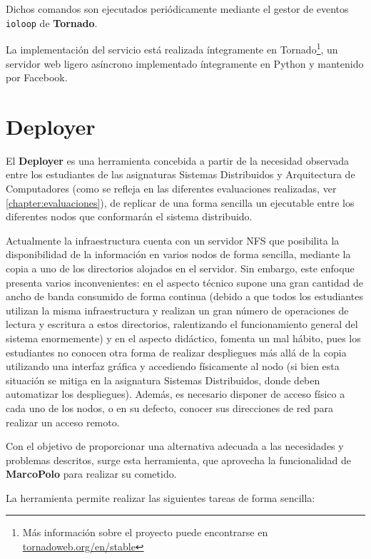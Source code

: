 Dichos comandos son ejecutados periódicamente mediante el gestor de eventos \texttt{ioloop} de \textbf{Tornado}.

La implementación del servicio está realizada íntegramente en Tornado\footnote{Más información sobre el proyecto puede encontrarse en \href{http://www.tornadoweb.org/en/stable/}{tornadoweb.org/en/stable}}, un servidor web ligero asíncrono implementado íntegramente en Python y mantenido por Facebook.

\section{Deployer}

El \textbf{Deployer} es una herramienta concebida a partir de la necesidad observada entre los estudiantes de las asignaturas Sistemas Distribuidos y Arquitectura de Computadores (como se refleja en las diferentes evaluaciones realizadas, ver \ref{chapter:evaluaciones}), de replicar de una forma sencilla un ejecutable entre los diferentes nodos que conformarán el sistema distribuido.

Actualmente la infraestructura cuenta con un servidor NFS que posibilita la disponibilidad de la información en varios nodos de forma sencilla, mediante la copia a uno de los directorios alojados en el servidor. Sin embargo, este enfoque presenta varios inconvenientes: en el aspecto técnico supone una gran cantidad de ancho de banda consumido de forma continua (debido a que todos los estudiantes utilizan la misma infraestructura y realizan un gran número de operaciones de lectura y escritura a estos directorios, ralentizando el funcionamiento general del sistema enormemente) y en el aspecto didáctico, fomenta un mal hábito, pues los estudiantes no conocen otra forma de realizar despliegues más allá de la copia utilizando una interfaz gráfica y accediendo físicamente al nodo (si bien esta situación se mitiga en la asignatura Sistemas Distribuidos, donde deben automatizar los despliegues). Además, es necesario disponer de acceso físico a cada uno de los nodos, o en su defecto, conocer sus direcciones de red para realizar un acceso remoto.

Con el objetivo de proporcionar una alternativa adecuada a las necesidades y problemas descritos, surge esta herramienta, que aprovecha la funcionalidad de \textbf{MarcoPolo} para realizar su cometido.

La herramienta permite realizar las siguientes tareas de forma sencilla:

